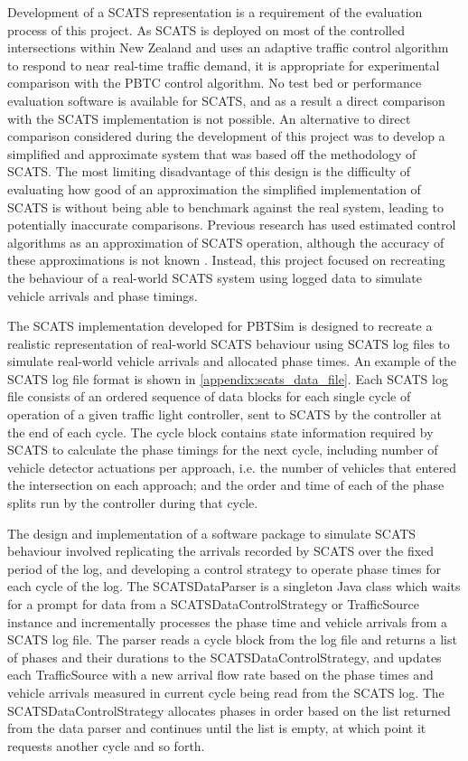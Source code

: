 Development of a SCATS representation is a requirement of the evaluation process of this project. As SCATS is deployed on most of the controlled intersections within New Zealand and uses an adaptive traffic control algorithm to respond to near real-time traffic demand, it is appropriate for experimental comparison with the PBTC control algorithm. No test bed or performance evaluation software is available for SCATS, and as a result a direct comparison with the SCATS implementation is not possible. An alternative to direct comparison considered during the development of this project was to develop a simplified and approximate system that was based off the methodology of SCATS. The most limiting disadvantage of this design is the difficulty of evaluating how good of an approximation the simplified implementation of SCATS is without being able to benchmark against the real system, leading to potentially inaccurate comparisons. Previous research has used estimated control algorithms as an approximation of SCATS operation, although the accuracy of these approximations is not known \cite{akcelik1998scats}. Instead, this project focused on recreating the behaviour of a real-world SCATS system using logged data to simulate vehicle arrivals and phase timings.

The SCATS implementation developed for PBTSim is designed to recreate a realistic representation of real-world SCATS behaviour using SCATS log files to simulate real-world vehicle arrivals and allocated phase times. An example of the SCATS log file format is shown in \ref{appendix:scats_data_file}. Each SCATS log file consists of an ordered sequence of data blocks for each single cycle of operation of a given traffic light controller, sent to SCATS by the controller at the end of each cycle. The cycle block contains state information required by SCATS to calculate the phase timings for the next cycle, including number of vehicle detector actuations per approach, i.e. the number of vehicles that entered the intersection on each approach; and the order and time of each of the phase splits run by the controller during that cycle. 

The design and implementation of a software package to simulate SCATS behaviour involved replicating the arrivals recorded by SCATS over the fixed period of the log, and developing a control strategy to operate phase times for each cycle of the log. The SCATSDataParser is a singleton Java class which waits for a prompt for data from a SCATSDataControlStrategy or TrafficSource instance and incrementally processes the phase time and vehicle arrivals from a SCATS log file. The parser reads a cycle block from the log file and returns a list of phases and their durations to the SCATSDataControlStrategy, and updates each TrafficSource with a new arrival flow rate based on the phase times and vehicle arrivals measured in current cycle being read from the SCATS log. The SCATSDataControlStrategy allocates phases in order based on the list returned from the data parser and continues until the list is empty, at which point it requests another cycle and so forth.

